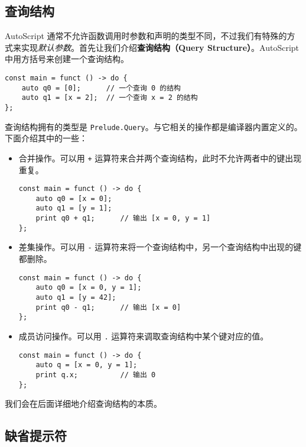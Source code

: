 \subsection{查询结构}

AutoScript 通常不允许函数调用时参数和声明的类型不同，不过我们有特殊的方式来实现\emph{默认参数}。首先让我们介绍\textbf{查询结构（Query Structure）}。AutoScript 中用方括号来创建一个查询结构。

\begin{lstlisting}
const main = funct () -> do {
    auto q0 = [0];      // 一个查询 0 的结构
    auto q1 = [x = 2];  // 一个查询 x = 2 的结构
};
\end{lstlisting}

查询结构拥有的类型是 \lstinline!Prelude.Query!。与它相关的操作都是编译器内置定义的。下面介绍其中的一些：

\begin{itemize}
    \item 合并操作。可以用 \lstinline!+! 运算符来合并两个查询结构，此时不允许两者中的键出现重复。

\begin{lstlisting}
const main = funct () -> do {
    auto q0 = [x = 0];
    auto q1 = [y = 1];
    print q0 + q1;      // 输出 [x = 0, y = 1]
};
\end{lstlisting}

    \item 差集操作。可以用 \lstinline!-! 运算符来将一个查询结构中，另一个查询结构中出现的键都删除。

\begin{lstlisting}
const main = funct () -> do {
    auto q0 = [x = 0, y = 1];
    auto q1 = [y = 42];
    print q0 - q1;      // 输出 [x = 0]
};
\end{lstlisting}

    \item 成员访问操作。可以用 \lstinline!.! 运算符来调取查询结构中某个键对应的值。

\begin{lstlisting}
const main = funct () -> do {
    auto q = [x = 0, y = 1];
    print q.x;          // 输出 0
};
\end{lstlisting}
\end{itemize}

我们会在后面详细地介绍查询结构的本质。

\subsection{缺省提示符}


